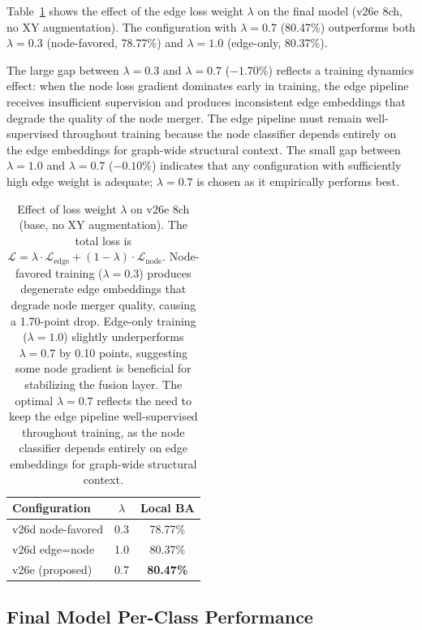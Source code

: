 Table~\ref{tab:lambda_ablation} shows the effect of the edge loss weight $\lambda$ on the final model (v26e 8ch, no XY augmentation). The configuration with $\lambda = 0.7$ (80.47\%) outperforms both $\lambda = 0.3$ (node-favored, 78.77\%) and $\lambda = 1.0$ (edge-only, 80.37\%).

The large gap between $\lambda = 0.3$ and $\lambda = 0.7$ ($-1.70\%$) reflects a training dynamics effect: when the node loss gradient dominates early in training, the edge pipeline receives insufficient supervision and produces inconsistent edge embeddings that degrade the quality of the node merger. The edge pipeline must remain well-supervised throughout training because the node classifier depends entirely on the edge embeddings for graph-wide structural context. The small gap between $\lambda = 1.0$ and $\lambda = 0.7$ ($-0.10\%$) indicates that any configuration with sufficiently high edge weight is adequate; $\lambda = 0.7$ is chosen as it empirically performs best.

\begin{table}[ht]
	\centering
	\caption{Effect of loss weight $\lambda$ on v26e 8ch (base, no XY augmentation). The total loss is $\mathcal{L} = \lambda \cdot \mathcal{L}_{\mathrm{edge}} + (1-\lambda) \cdot \mathcal{L}_{\mathrm{node}}$. Node-favored training ($\lambda=0.3$) produces degenerate edge embeddings that degrade node merger quality, causing a 1.70-point drop. Edge-only training ($\lambda=1.0$) slightly underperforms $\lambda=0.7$ by 0.10 points, suggesting some node gradient is beneficial for stabilizing the fusion layer. The optimal $\lambda=0.7$ reflects the need to keep the edge pipeline well-supervised throughout training, as the node classifier depends entirely on edge embeddings for graph-wide structural context.}
	\label{tab:lambda_ablation}
	\begin{tabular}{lcc}
		\toprule
		\textbf{Configuration} & $\lambda$ & \textbf{Local BA} \\
		\midrule
		v26d node-favored        & 0.3       & 78.77\%           \\
		v26d edge=node           & 1.0       & 80.37\%           \\
		v26e (proposed)          & 0.7       & \textbf{80.47\%}  \\
		\bottomrule
	\end{tabular}
\end{table}

\subsection{Final Model Per-Class Performance}

